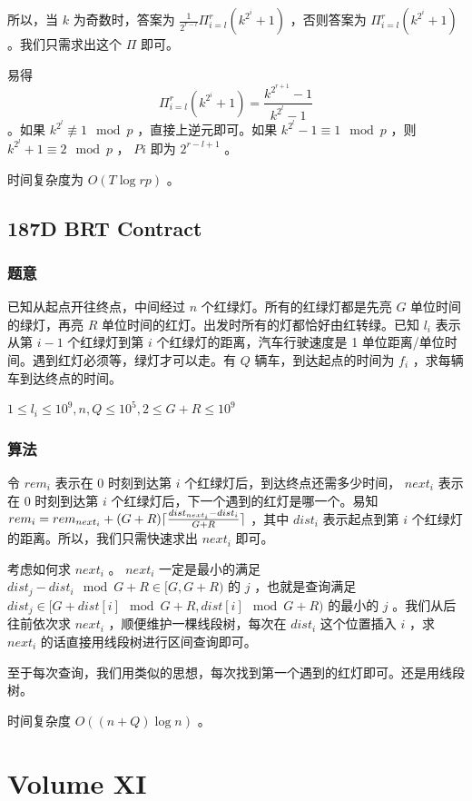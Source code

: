 \documentclass[11pt]{article}
\begin{document}
    所以，当 $k$ 为奇数时，答案为 $\frac{1}{2^{r - l}} \Pi_{i = l}^r (k^{2^i} + 1)$ ，否则答案为 $\Pi_{i = l}^r (k^{2^i} + 1)$ 。我们只需求出这个 $\Pi$ 即可。

    易得 $$\Pi_{i = l}^r (k^{2^i} + 1) = \frac{k^{2^{r + 1}} - 1}{k^{2^l} - 1}$$ 。如果 $k^{2^l} \not\equiv 1 \mod{p}$ ，直接上逆元即可。如果 $k^{2^l} - 1 \equiv 1 \mod{p}$ ，则 $k^{2^l} + 1 \equiv 2 \mod{p}$ ， $Pi$ 即为 $2^{r - l + 1}$ 。

    时间复杂度为 $O(T \log rp)$ 。
\subsection{187D  BRT Contract}
\label{sec-10-9}
\subsubsection{题意}
\label{sec-10-9-1}

    已知从起点开往终点，中间经过 $n$ 个红绿灯。所有的红绿灯都是先亮 $G$ 单位时间的绿灯，再亮 $R$ 单位时间的红灯。出发时所有的灯都恰好由红转绿。已知 $l_i$ 表示从第 $i - 1$ 个红绿灯到第 $i$ 个红绿灯的距离，汽车行驶速度是 1 单位距离/单位时间。遇到红灯必须等，绿灯才可以走。有 $Q$ 辆车，到达起点的时间为 $f_i$ ，求每辆车到达终点的时间。

    $1 \leq l_i \leq 10^9, n, Q \leq 10^5, 2 \leq G + R \leq 10^9$
\subsubsection{算法}
\label{sec-10-9-2}

    令 $rem_i$ 表示在 0 时刻到达第 $i$ 个红绿灯后，到达终点还需多少时间， $next_i$ 表示在 0 时刻到达第 $i$ 个红绿灯后，下一个遇到的红灯是哪一个。易知 $rem_i = rem_{next_i} + (G + R){\lceil \frac{dist_{next_i} - dist_i}{G + R} \rceil}$ ，其中 $dist_i$ 表示起点到第 $i$ 个红绿灯的距离。所以，我们只需快速求出 $next_i$ 即可。

    考虑如何求 $next_i$ 。 $next_i$ 一定是最小的满足 $dist_j - dist_i \mod{G + R} \in [G, G + R)$ 的 $j$ ，也就是查询满足 $dist_j \in [G + dist[i] \mod{G + R}, dist[i] \mod{G + R})$ 的最小的 $j$ 。我们从后往前依次求 $next_i$ ，顺便维护一棵线段树，每次在 $dist_i$ 这个位置插入 $i$ ，求 $next_i$ 的话直接用线段树进行区间查询即可。

    至于每次查询，我们用类似的思想，每次找到第一个遇到的红灯即可。还是用线段树。

    时间复杂度 $O((n + Q) \log n)$ 。
\section{Volume XI}
\label{sec-11}
\end{document}
